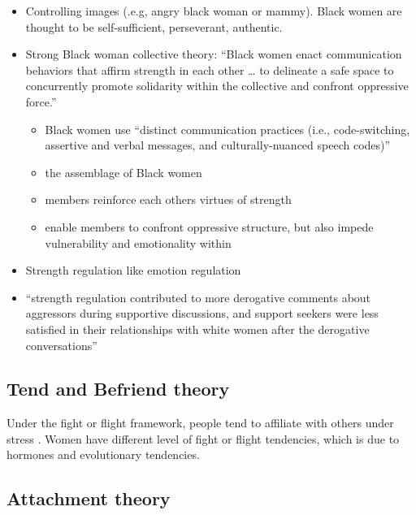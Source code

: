 \documentclass[
]{book}
\begin{document}
\citep{Davis_2019}

\begin{itemize}
\item
  Controlling images (.e.g, angry black woman or mammy). Black women are thought to be self-sufficient, perseverant,
  authentic.
\item
  Strong Black woman collective theory: ``Black women enact communication behaviors that affirm strength in each other
  \ldots{} to delineate a safe space to concurrently promote solidarity within the collective and confront oppressive
  force.''

  \begin{itemize}
  \item
    Black women use ``distinct communication practices (i.e., code-switching, assertive and verbal messages, and
    culturally-nuanced speech codes)''
  \item
    the assemblage of Black women
  \item
    members reinforce each others virtues of strength
  \item
    enable members to confront oppressive structure, but also impede vulnerability and emotionality within
  \end{itemize}
\item
  Strength regulation like emotion regulation
\item
  ``strength regulation contributed to more derogative comments about aggressors during supportive discussions, and
  support seekers were less satisfied in their relationships with white women after the derogative conversations''
\end{itemize}

\hypertarget{tend-and-befriend-theory}{%
\subsection{Tend and Befriend theory}\label{tend-and-befriend-theory}}

Under the fight or flight framework, people tend to affiliate with others under stress \citep{Taylor_2012}. Women have
different level of fight or flight tendencies, which is due to hormones and evolutionary tendencies.

\hypertarget{attachment-theory}{%
\subsection{Attachment theory}\label{attachment-theory}}
\end{document}
